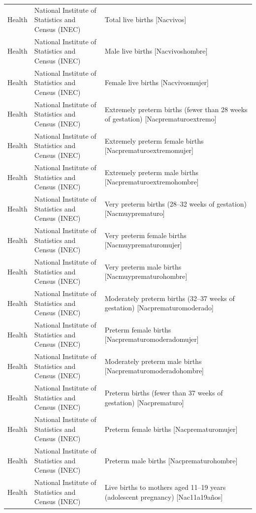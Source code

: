 \begin{landscape}
\begin{longtable}[t]{>{\raggedright\arraybackslash}p{3.4cm}>{\raggedright\arraybackslash}p{5.6cm}>{\raggedright\arraybackslash}p{12.4cm}}
\endfoot
\bottomrule
\endlastfoot
Health & National Institute of Statistics and Census (INEC) & Total live births [Nacvivos]\\
Health & National Institute of Statistics and Census (INEC) & Male live births [Nacvivoshombre]\\
Health & National Institute of Statistics and Census (INEC) & Female live births [Nacvivosmujer]\\
Health & National Institute of Statistics and Census (INEC) & Extremely preterm births (fewer than 28 weeks of gestation) [Nacprematuroextremo]\\
Health & National Institute of Statistics and Census (INEC) & Extremely preterm female births [Nacprematuroextremomuj\allowbreak{}er]\\
Health & National Institute of Statistics and Census (INEC) & Extremely preterm male births [Nacprematuroextremohom\allowbreak{}bre]\\
Health & National Institute of Statistics and Census (INEC) & Very preterm births (28–32 weeks of gestation) [Nacmuyprematuro]\\
Health & National Institute of Statistics and Census (INEC) & Very preterm female births [Nacmuyprematuromujer]\\
Health & National Institute of Statistics and Census (INEC) & Very preterm male births [Nacmuyprematurohombre]\\
Health & National Institute of Statistics and Census (INEC) & Moderately preterm births (32–37 weeks of gestation) [Nacprematuromoderado]\\
Health & National Institute of Statistics and Census (INEC) & Preterm female births [Nacprematuromoderadomu\allowbreak{}jer]\\
Health & National Institute of Statistics and Census (INEC) & Moderately preterm male births [Nacprematuromoderadoho\allowbreak{}mbre]\\
Health & National Institute of Statistics and Census (INEC) & Preterm births (fewer than 37 weeks of gestation) [Nacprematuro]\\
Health & National Institute of Statistics and Census (INEC) & Preterm female births [Nacprematuromujer]\\
Health & National Institute of Statistics and Census (INEC) & Preterm male births [Nacprematurohombre]\\
Health & National Institute of Statistics and Census (INEC) & Live births to mothers aged 11–19 years (adolescent pregnancy) [Nac11a19años]\\

\end{longtable}
\end{landscape}
